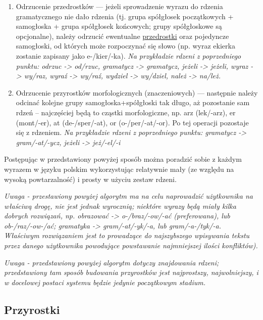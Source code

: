 \documentclass[12p, oneside]{book}
\begin{document}
\begin{itemize}
\begin{enumerate}
{{				zasady tworzenia akordów lub skróty, z racji na
				częstość występowania.}, rdzenia -> rdzen/ia.}
			\item Odrzucenie przedrostków --- jeżeli sprowadzenie
				wyrazu do rdzenia gramatycznego nie dało rdzenia
				(tj. grupa spółgłosek początkowych + samogłoska
				+ grupa spółgłosek końcowych; grupy spółgłoskowe
				są opcjonalne), należy odrzucić ewentualne
				\hyperref[ssec:przedrostki]{przedrostki} oraz
				pojedyncze samogłoski, od których może
				rozpoczynać się słowo (np. wyraz ekierka
				zostanie zapisany jako e-/kier/-ka).
				\emph{Na przykładzie rdzeni z poprzedniego
				punktu: odrzuc -> od/rzuc, gramatycz ->
				gramatycz, jeżeli -> jeżeli, wyraz -> wy/raz,
				wyraź -> wy/raź, wydziel -> wy/dziel, należ ->
				na/leż.}
			\item Odrzucenie przyrostków morfologicznych
				(znaczeniowych) --- następnie należy odcinać
				kolejne	grupy samogłoska+spółgłoski tak długo,
				aż pozostanie sam rdzeń -- najczęściej będą to
				cząstki morfologiczne, np. arz (lek/-arz), er
				(mont/-er), at (de-/sper/-at), or
				(o-/per/-at/-or). Po tej operacji pozostaje się
				z rdzeniem.
				\emph{Na przykładzie rdzeni z poprzedniego
				punktu: gramatycz -> gram/-at/-ycz, jeżeli ->
				jeż/-el/-i}
		\end{enumerate}
		Postępując w przedstawiony powyżej sposób można poradzić sobie z
		każdym wyrazem w języku polskim wykorzystując relatywnie mały
		(ze względu na wysoką powtarzalność) i prosty w użyciu zestaw
		rdzeni.
\end{itemize}

\emph{Uwaga - przestawiony powyżej algorytm ma na celu naprowadzić użytkownika
na właściwą drogę, nie jest jednak wyrocznią; niektóre wyrazy będą miały kilka
dobrych rozwiązań, np. obrazować -> o-/braz/-ow/-ać (preferowana), lub
ob-/raz/-ow-/ać; gramatyka -> gram/-at/-yk/-a, lub gram/-a-/tyk/-a. Właściwym
rozwiązaniem jest to prowadzące do najszybszego wpisywania tekstu przez danego
użytkownika powodujące powstawanie najmniejszej ilości konfliktów).}

\emph{Uwaga - przedstawiony powyżej algorytm dotyczy znajdowania rdzeni;
przedstawiony tam sposób budowania przyrostków jest najprostszy, najwolniejszy,
i w docelowej postaci systemu będzie jedynie początkowym stadium.}

\newpage

\subsection{Przyrostki}
\end{document}
